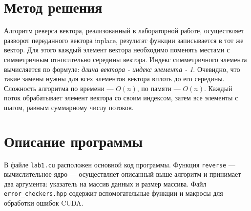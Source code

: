 \section{Метод решения}
Алгоритм реверса вектора, реализованный в лабораторной работе, осуществляет разворот переданного вектора inplace, результат функции записывается в тот же вектор. Для этого каждый элемент вектора необходимо поменять местами с симметричным относительно середины вектора. Индекс симметричного элемента вычисляется по формуле: \textit{длина вектора - индекс элемента - 1}. Очевидно, что такие замены нужны для всех элементов вектора вплоть до его середины. Сложность алгоритма по времени --- $O(n)$, по памяти --- $O(n)$. Каждый поток обрабатывает элемент вектора со своим индексом, затем все элементы с шагом, равным суммарному числу потоков.

\section{Описание программы}
В файле \texttt{lab1.cu} расположен основной код программы. Функция \texttt{reverse} --- вычислительное ядро --- осуществляет описанный выше алгоритм и принимает два аргумента: указатель на массив данных и размер массива. Файл \texttt{error\_checkers.hpp} содержит вспомогательные функции и макросы для обработки ошибок CUDA.
